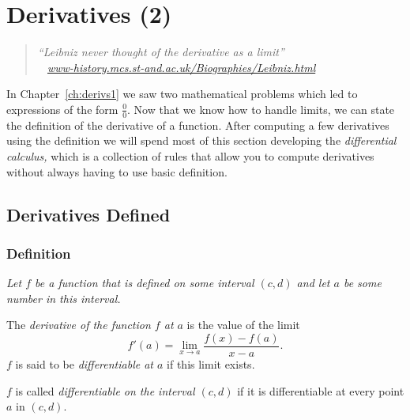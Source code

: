 \chapter{Derivatives (2)}

\begin{quote}\itshape
    ``Leibniz never thought of the derivative as a limit''\\[1ex]
  \footnotesize~\hfill
  \href{http://www-history.mcs.st-and.ac.uk/Biographies/Leibniz.html}
  {www-history.mcs.st-and.ac.uk/Biographies/Leibniz.html}\\
\end{quote}

\medskip

\noindent
In Chapter~\ref{ch:derivs1} we saw two mathematical problems which led
to expressions of the form $\frac00$.  Now that we know how to handle
limits, we can state the definition of the derivative of a function.
\marginpar{\footnotesize\sffamily%
  \\
  \\
  \\
   }%
After computing a few derivatives using the definition we will spend
most of this section developing the \textit{differential calculus,}
which is a collection of rules that allow you to compute derivatives
without always having to use basic definition.

\section{Derivatives Defined}
%
\subsection{Definition}
\label{def:derivative}\itshape 
Let $f$ be a function that is defined on some interval $(c, d)$
and let $a$ be some number in this interval.

The \emph{derivative of the function $f$ at $a$} is the value of the limit
\begin{equation}\label{eq:derivative-defined}
  f'(a)=\lim_{x\to a} \frac{f(x)-f(a)}{x-a}.
\end{equation}
$f$ is said to be \emph{differentiable at $a$} if this limit exists.

\noindent
$f$ is called \emph{differentiable on the interval $(c, d)$} if it is
differentiable at every point $a$ in $(c,d)$.

